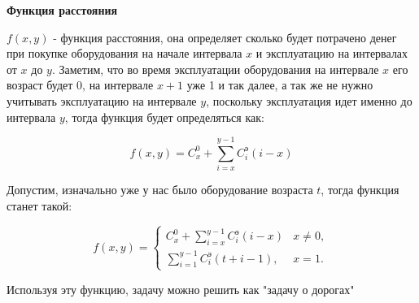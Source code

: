 \bigskip

\textbf{Функция расстояния}

$f(x,y)$ - функция расстояния, она определяет сколько будет потрачено денег при покупке оборудования на начале интервала $x$ и эксплуатацию на интервалах от $x$ до $y$. Заметим, что во время эксплуатации оборудования на интервале $x$ его возраст будет 0, на интервале $x+1$ уже 1 и так далее, а так же не нужно учитывать эксплуатацию на интервале $y$, поскольку эксплуатация идет именно до интервала $y$, тогда функция будет определяться как: 

\[
\boxed{ f(x,y) = C_x^0 + \sum_{i=x}^{y-1} C_i^\text{э} (i-x) }
\]

Допустим, изначально уже у нас было оборудование возраста $t$, тогда функция станет такой:

\[
\boxed{ f(x,y) = \begin{cases}
		C_x^0 + \sum\limits_{i=x}^{y-1} C_i^\text{э} (i-x) & x \neq 0, \\
		\sum\limits_{i=1}^{y-1} C_i^\text{э} (t + i- 1), & x = 1.
	\end{cases} }
\]

Используя эту функцию, задачу можно решить как "задачу о дорогах"

\bigskip